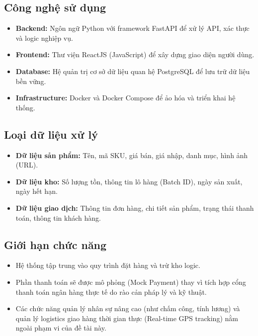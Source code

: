 \subsection{Công nghệ sử dụng}
\begin{itemize}
    \item \textbf{Backend:} Ngôn ngữ Python với framework FastAPI để xử lý API, xác thực và logic nghiệp vụ.
    \item \textbf{Frontend:} Thư viện ReactJS (JavaScript) để xây dựng giao diện người dùng.
    \item \textbf{Database:} Hệ quản trị cơ sở dữ liệu quan hệ PostgreSQL để lưu trữ dữ liệu bền vững.
    \item \textbf{Infrastructure:} Docker và Docker Compose để ảo hóa và triển khai hệ thống.
\end{itemize}

\subsection{Loại dữ liệu xử lý}
\begin{itemize}
    \item \textbf{Dữ liệu sản phẩm:} Tên, mã SKU, giá bán, giá nhập, danh mục, hình ảnh (URL).
    \item \textbf{Dữ liệu kho:} Số lượng tồn, thông tin lô hàng (Batch ID), ngày sản xuất, ngày hết hạn.
    \item \textbf{Dữ liệu giao dịch:} Thông tin đơn hàng, chi tiết sản phẩm, trạng thái thanh toán, thông tin khách hàng.
\end{itemize}

\subsection{Giới hạn chức năng}
\begin{itemize}
    \item Hệ thống tập trung vào quy trình đặt hàng và trừ kho logic.
    \item Phần thanh toán sẽ được mô phỏng (Mock Payment) thay vì tích hợp cổng thanh toán ngân hàng thực tế do rào cản pháp lý và kỹ thuật.
    \item Các chức năng quản lý nhân sự nâng cao (như chấm công, tính lương) và quản lý logistics giao hàng thời gian thực (Real-time GPS tracking) nằm ngoài phạm vi của đề tài này.
\end{itemize}